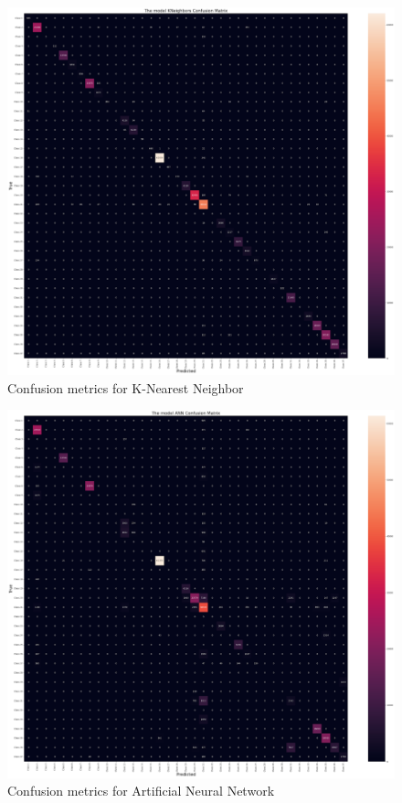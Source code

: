 \documentclass[conference,final,]{IEEEtran}
\begin{document}
\begin{figure}

{\centering \includegraphics[width=0.7\linewidth]{img/fig13} 

}

\caption{Confusion metrics for K-Nearest Neighbor}\label{fig:unnamed-chunk-13}
\end{figure}

\begin{figure}

{\centering \includegraphics[width=0.7\linewidth]{img/ANN} 

}

\caption{Confusion metrics for Artificial Neural Network}\label{fig:unnamed-chunk-14}
\end{figure}
\end{document}
